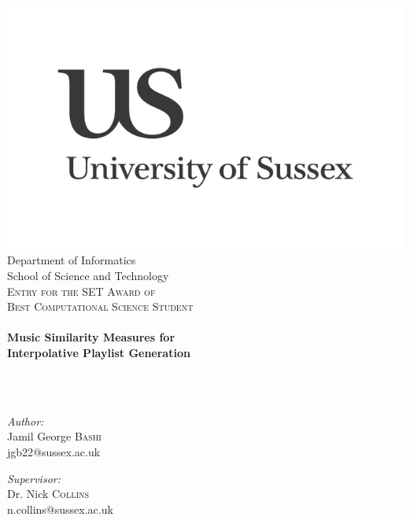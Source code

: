 \begin{titlepage}
\begin{center}
\includegraphics[width=0.5\linewidth]{front/images/us-logo}\\
\small Department of Informatics\\
School of Science and Technology\\[2cm]

\textsc{\Large Entry for the SET Award of \\[0.2cm]
Best Computational Science Student}\\[2cm]

\hrulefill \\[0.8cm]
{ \huge \bfseries Music Similarity Measures for\\
Interpolative Playlist Generation}\\[0.8cm]

\hrulefill \\[1.5cm]
\end{center}
 \\[1cm]
\begin{center}
\begin{minipage}{0.45\textwidth}
\begin{flushleft} \large
\emph{Author:}\\
Jamil George \textsc{Bashi}\\
jgb22@sussex.ac.uk
\end{flushleft}
\end{minipage}
\begin{minipage}{0.45\textwidth}
\begin{flushright} \large
\emph{Supervisor:} \\
Dr. Nick \textsc{Collins}\\
n.collins@sussex.ac.uk
\end{flushright}
\end{minipage}
\vspace{25cm}

\end{center}
\end{titlepage}
